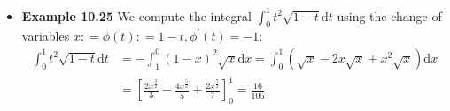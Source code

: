 \begin{itemize}
 
\item \textbf{Example 10.25}  
We compute the integral $\int _ { 0} ^ { 1} t ^ { 2} \sqrt { 1- t } \text{d} t$ using the change of variables $x : = \phi ( t ) : = 1- t ,\phi ^ { \prime } ( t ) = - 1$:
\begin{equation}
\begin{split}
\int _ { 0} ^ { 1} t ^ { 2} \sqrt { 1- t } \text{d} t &= - \int _ { 1} ^ { 0} ( 1- x ) ^ { 2} \sqrt { x } \text{d} x = \int _ { 0} ^ { 1} \left( \sqrt { x } - 2x \sqrt { x } + x ^ { 2} \sqrt { x } \right) \text{d} x \\
 &= \left[ \frac { 2x ^ { \frac { 3} { 2} } } { 3} - \frac { 4x ^ { \frac { 5} { 2} } } { 5} + \frac { 2x ^ { \frac { 7} { 2} } } { 7} \right] _ { 0} ^ { 1} = \frac { 16} { 105}
\end{split}
\end{equation}

\end{itemize}



